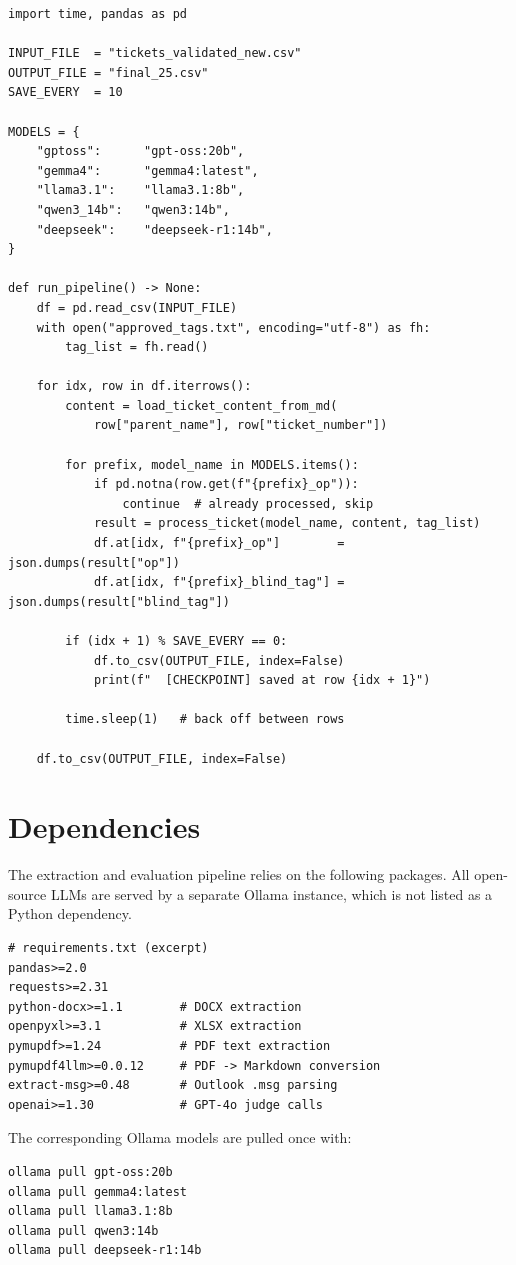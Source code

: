 \begin{verbatim}
import time, pandas as pd

INPUT_FILE  = "tickets_validated_new.csv"
OUTPUT_FILE = "final_25.csv"
SAVE_EVERY  = 10

MODELS = {
    "gptoss":      "gpt-oss:20b",
    "gemma4":      "gemma4:latest",
    "llama3.1":    "llama3.1:8b",
    "qwen3_14b":   "qwen3:14b",
    "deepseek":    "deepseek-r1:14b",
}

def run_pipeline() -> None:
    df = pd.read_csv(INPUT_FILE)
    with open("approved_tags.txt", encoding="utf-8") as fh:
        tag_list = fh.read()

    for idx, row in df.iterrows():
        content = load_ticket_content_from_md(
            row["parent_name"], row["ticket_number"])

        for prefix, model_name in MODELS.items():
            if pd.notna(row.get(f"{prefix}_op")):
                continue  # already processed, skip
            result = process_ticket(model_name, content, tag_list)
            df.at[idx, f"{prefix}_op"]        = json.dumps(result["op"])
            df.at[idx, f"{prefix}_blind_tag"] = json.dumps(result["blind_tag"])

        if (idx + 1) % SAVE_EVERY == 0:
            df.to_csv(OUTPUT_FILE, index=False)
            print(f"  [CHECKPOINT] saved at row {idx + 1}")

        time.sleep(1)   # back off between rows

    df.to_csv(OUTPUT_FILE, index=False)
\end{verbatim}

\section{Dependencies}
\label{sec:app-deps}
%
The extraction and evaluation pipeline relies on the following packages.
All open-source LLMs are served by a separate Ollama instance, which is not
listed as a Python dependency.

\begin{verbatim}
# requirements.txt (excerpt)
pandas>=2.0
requests>=2.31
python-docx>=1.1        # DOCX extraction
openpyxl>=3.1           # XLSX extraction
pymupdf>=1.24           # PDF text extraction
pymupdf4llm>=0.0.12     # PDF -> Markdown conversion
extract-msg>=0.48       # Outlook .msg parsing
openai>=1.30            # GPT-4o judge calls
\end{verbatim}

\noindent The corresponding Ollama models are pulled once with:

\begin{verbatim}
ollama pull gpt-oss:20b
ollama pull gemma4:latest
ollama pull llama3.1:8b
ollama pull qwen3:14b
ollama pull deepseek-r1:14b
\end{verbatim}
